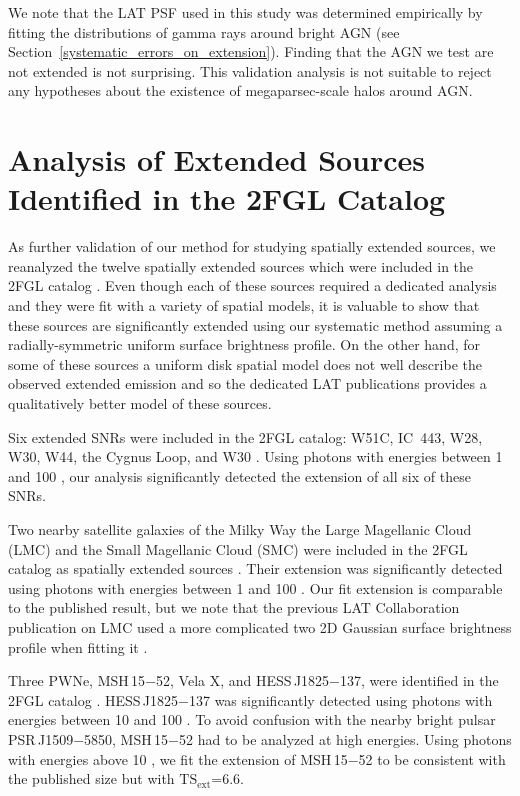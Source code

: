 \documentclass[12pt,preprint]{aastex}
\newcommand{\gev}{\text{GeV}\xspace}
\newcommand{\tsext}{{\ensuremath{\text{TS}_{\text{ext}}}}\xspace}
\begin{document}
We note that the LAT PSF used in this study was determined
empirically by fitting the distributions of gamma rays around bright AGN (see
Section~\ref{systematic_errors_on_extension}). Finding that the AGN we
test are not extended is not surprising.  This validation analysis is
not suitable to reject any hypotheses about the existence of megaparsec-scale
halos around AGN.

\section{Analysis of Extended Sources Identified in the 2FGL Catalog}
\label{validate_known}

As further validation of our method for studying
spatially extended sources, we reanalyzed the twelve spatially extended
sources which were included in the 2FGL catalog \citep{second_cat}.  Even though
each of these sources required a dedicated analysis and they
were fit with a variety of spatial models, it is valuable to show that
these sources are significantly extended using our systematic 
method assuming a radially-symmetric uniform surface
brightness profile.  On the other hand, for some of
these sources a uniform disk spatial model does not well describe the
observed extended emission and so the dedicated LAT publications provides
a qualitatively better model of these sources.



Six extended SNRs were
included in the 2FGL catalog: W51C, IC~443, W28, W30, W44, the Cygnus Loop,
and W30
\citep{w51c,ic443,w28,w44,cygnus_loop_lat,w30_lat}.
Using photons
with energies between
1 \gev and 100 \gev, our analysis significantly detected
the extension of all six of these SNRs.


Two nearby satellite galaxies of the Milky Way the Large Magellanic Cloud (LMC)
and the Small Magellanic
Cloud (SMC) were included in the 2FGL catalog as spatially extended sources \citep{lmc,smc}.  
Their extension was significantly
detected using photons with energies between
1 \gev and 100 \gev. Our
fit extension is comparable to the published result, but we note that
the previous LAT Collaboration publication on LMC used a more complicated two 2D Gaussian surface
brightness profile when fitting it \citep{lmc}.

Three PWNe, MSH\,15$-$52, Vela X, and HESS\,J1825$-$137, were identified
in the 2FGL catalog \citep{msh1552,velax,fermi_hess_j1825}.  HESS\,J1825$-$137
was significantly detected using photons with energies between 10
\gev and 100 \gev.  To avoid confusion with the nearby bright pulsar
PSR\,J1509$-$5850, MSH\,15$-$52 had to be analyzed at high energies.
Using photons with energies above 10 \gev, we fit the extension of
MSH\,15$-$52 to be consistent with the published size but with \tsext=6.6.
\end{document}
